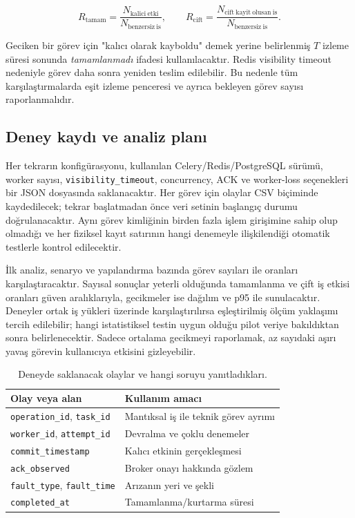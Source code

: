 \documentclass[conference,a4paper]{IEEEtran}
\newcommand{\code}[1]{\texttt{#1}}
\begin{document}
\begin{equation}
R_{\mathrm{tamam}} = \frac{N_{\mathrm{kalici\ etki}}}{N_{\mathrm{benzersiz\ is}}},\qquad
R_{\mathrm{cift}} = \frac{N_{\mathrm{cift\ kayit\ olusan\ is}}}{N_{\mathrm{benzersiz\ is}}}.
\label{eq:rates}
\end{equation}

Geciken bir görev için "kalıcı olarak kayboldu" demek yerine belirlenmiş \(T\) izleme süresi sonunda \emph{tamamlanmadı} ifadesi kullanılacaktır. Redis visibility timeout nedeniyle görev daha sonra yeniden teslim edilebilir. Bu nedenle tüm karşılaştırmalarda eşit izleme penceresi ve ayrıca bekleyen görev sayısı raporlanmalıdır.

\subsection{Deney kaydı ve analiz planı}
Her tekrarın konfigürasyonu, kullanılan Celery/Redis/PostgreSQL sürümü, worker sayısı, \code{visibility\_timeout}, concurrency, ACK ve worker-loss seçenekleri bir JSON dosyasında saklanacaktır. Her görev için olaylar CSV biçiminde kaydedilecek; tekrar başlatmadan önce veri setinin başlangıç durumu doğrulanacaktır. Aynı görev kimliğinin birden fazla işlem girişimine sahip olup olmadığı ve her fiziksel kayıt satırının hangi denemeyle ilişkilendiği otomatik testlerle kontrol edilecektir.

İlk analiz, senaryo ve yapılandırma bazında görev sayıları ile oranları karşılaştıracaktır. Sayısal sonuçlar yeterli olduğunda tamamlanma ve çift iş etkisi oranları güven aralıklarıyla, gecikmeler ise dağılım ve p95 ile sunulacaktır. Deneyler ortak iş yükleri üzerinde karşılaştırılırsa eşleştirilmiş ölçüm yaklaşımı tercih edilebilir; hangi istatistiksel testin uygun olduğu pilot veriye bakıldıktan sonra belirlenecektir. Sadece ortalama gecikmeyi raporlamak, az sayıdaki aşırı yavaş görevin kullanıcıya etkisini gizleyebilir.

\begin{table}[t]
\caption{Deneyde saklanacak olaylar ve hangi soruyu yanıtladıkları.}
\centering\footnotesize
\begin{tabularx}{\columnwidth}{@{}p{31mm}X@{}}
\toprule
Olay veya alan & Kullanım amacı\\
\midrule
\code{operation\_id}, \code{task\_id} & Mantıksal iş ile teknik görev ayrımı\\
\code{worker\_id}, \code{attempt\_id} & Devralma ve çoklu denemeler\\
\code{commit\_timestamp} & Kalıcı etkinin gerçekleşmesi\\
\code{ack\_observed} & Broker onayı hakkında gözlem\\
\code{fault\_type}, \code{fault\_time} & Arızanın yeri ve şekli\\
\code{completed\_at} & Tamamlanma/kurtarma süresi\\
\bottomrule
\end{tabularx}
\label{tab:logs}
\end{table}
\end{document}
